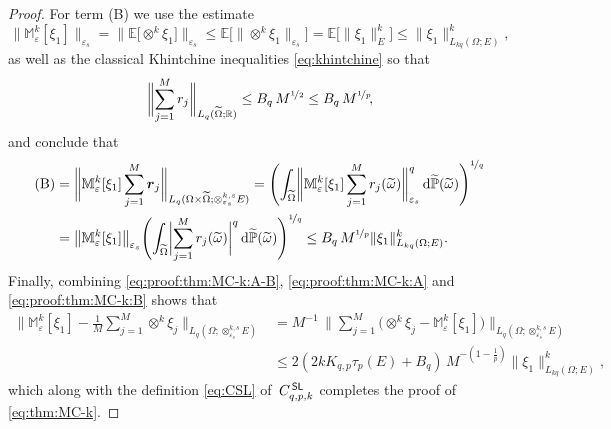 \documentclass[10pt,a4paper]{amsart}
\newcommand{\CSL}{C^{\,\sf SL}_{q,p,k}}
\newcommand{\Mk}{\bbM^k_\varepsilon}
\newcommand{\bbE}{\mathbb{E}}
\newcommand{\bbM}{\mathbb{M}}
\newcommand{\bbP}{\mathbb{P}}
\newcommand{\bbPt}{\widetilde{\bbP}}
\newcommand{\bbR}{\mathbb{R}}
\newcommand{\eps}{\varepsilon}
\newcommand{\norm}[2]{     \| #1       \|_{ #2 }}
\newcommand{\omegat}{\widetilde{\omega}}
\newcommand{\rd}{\mathrm{d}}
\newcommand{\rvec}{\boldsymbol{r}}
\newcommand{\xk}{\otimes^k}
\newcommand{\xkseps}{\otimes^{k,s}_{\varepsilon_s}}
\begin{document}
\begin{proof}
	For term (B) we use the estimate  
	\[
	\bigl\| \Mk[\xi_1] \bigr\|_{\eps_s}  
	= 
	\bigl\| \bbE\bigl[ \xk \xi_1 \bigr] \bigr\|_{\eps_s} 
	\leq 
	\bbE\bigl[ \norm{ {\xk} \xi_1 }{\eps_s} \bigr]
	= 
	\bbE\bigl[ \norm{ \xi_1 }{E}^k \bigr] 
	\leq 
	\norm{ \xi_1 }{L_{kq}(\Omega;E)}^k , 
	\]
	as well as the classical 
	Khintchine inequalities \eqref{eq:khintchine}
	so that 
	\[
	\biggl\| 
	\sum_{j=1}^M 
	r_j 
	\biggr\|_{L_q(\widetilde{\Omega};\bbR)} 
	\leq 
	B_q \, M^{\nicefrac{1}{2}} 
	\leq 
	B_q \, M^{\nicefrac{1}{p}} \!, 
	\]
	and conclude that 
	\begin{equation}\label{eq:proof:thm:MC-k:B}   
	\begin{split} 
	\text{(B)}  
	&= 
	\biggl\| 
	\Mk[\xi_1] 
	\sum_{j=1}^M 
	\rvec_j 
	\biggr\|_{L_q(\Omega\times\widetilde{\Omega};\xkseps E)}   
	= 
	\Biggl( 
	\int_{\widetilde{\Omega}} 
	\biggl\| 
	\Mk[\xi_1] 
	\sum_{j=1}^M 
	r_j (\omegat) 
	\biggr\|_{\eps_s}^q   
	\, \rd\bbPt(\omegat) 
	\Biggr)^{\nicefrac{1}{q}} 
	\\
	&=
	\bigl\| 
	\Mk[\xi_1]  
	\bigr\|_{\eps_s} 
	\Biggl( 
	\int_{\widetilde{\Omega}} 
	\biggl| 
	\sum_{j=1}^M 
	r_j(\widetilde{\omega}) 
	\biggr|^q 
	\, \rd\bbPt(\omegat) 
	\Biggr)^{\nicefrac{1}{q}} 
	\leq 
	B_q \, M^{\nicefrac{1}{p}} 
	\norm{ \xi_1 }{L_{kq}(\Omega; E)}^k . 
	\end{split} 
	\end{equation} 
	Finally, combining \eqref{eq:proof:thm:MC-k:A-B}, 
	\eqref{eq:proof:thm:MC-k:A} and 
	\eqref{eq:proof:thm:MC-k:B} shows that 
	\begin{align*} 
	\biggl\| 
	\Mk[\xi_1] 
	-
	\frac{1}{M} 
	\sum_{j=1}^M 
	\xk \xi_j 
	\biggr\|_{L_q(\Omega;\xkseps E)} 
	&=
	M^{-1} \, 
	\biggl\| 
	\sum_{j=1}^M 
	\bigl(\xk \xi_j -  \Mk[\xi_1] \bigr)
	\biggr\|_{L_q(\Omega;\xkseps E)} 
	\\
	&\leq 
	2 
	( 2k K_{q,p} \tau_p(E) + B_q) \, 
	M^{-\left(1-\frac{1}{p}\right)} 
	\norm{ \xi_1 }{L_{kq}(\Omega;E)}^k, 
	\end{align*} 
	which along with 
	the definition \eqref{eq:CSL} 
	of~$\CSL$ 
	completes the proof 
	of \eqref{eq:thm:MC-k}. 
\end{proof} 
\end{document}
